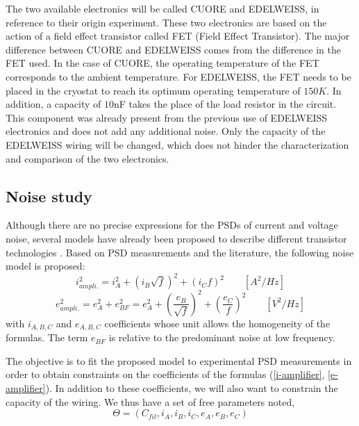 The two available electronics will be called CUORE and EDELWEISS, in reference to their origin experiment. These two electronics are based on the action of a field effect transistor called FET (Field Effect Transistor). The major difference between CUORE and EDELWEISS comes from the difference in the FET used. In the case of CUORE, the operating temperature of the FET corresponds to the ambient temperature. For EDELWEISS, the FET needs to be placed in the cryostat to reach its optimum operating temperature of $150 K$. In addition, a capacity of $10$nF takes the place of the load resistor in the circuit. This component was already present from the previous use of EDELWEISS electronics and does not add any additional noise. Only the capacity of the EDELWEISS wiring will be changed, which does not hinder the characterization and comparison of the two electronics.


\subsection{Noise study}

Although there are no precise expressions for the PSDs of current and voltage noise, several models have already been proposed to describe different transistor technologies \cite{low-low-noise-electronic} \cite{alex}. Based on PSD measurements and the literature, the following noise model is proposed:
\begin{equation}
\label{i-amplifier}
i_{ampli.}^2 = i_A^2 + (i_B \sqrt{f})^2 + (i_C f)^2 \qquad [A^2/Hz]
\end{equation}
\begin{equation}
\label{e-amplifier}
e_{ampli.}^2 = e_A^2 + e_{BF}^2 = e_A^2 + \left( \frac{e_B}{\sqrt{f}} \right)^2 +\left( \frac{e_C}{f} \right)^2 \qquad [V^2/Hz]
\end{equation}
with $i_{A,B,C}$ and $e_{A,B,C}$ coefficients whose unit allows the homogeneity of the formulas. The term $e_{BF}$ is relative to the predominant noise at low frequency.

The objective is to fit the proposed model to experimental PSD measurements in order to obtain constraints on the coefficients of the formulas (\ref{i-amplifier}, \ref{e-amplifier}). In addition to these coefficients, we will also want to constrain the capacity of the wiring. We thus have a set of free parameters noted,
\begin{equation}
\Theta=(C_{fil}, i_A, i_B, i_C, e_A, e_B, e_C)
\end{equation}

